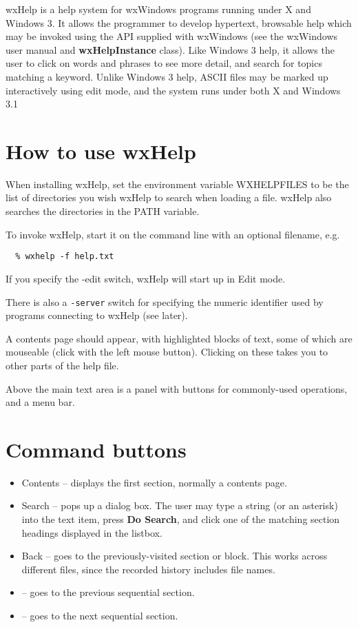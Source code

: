 wxHelp is a help system for wxWindows programs running under X and Windows 3.
It allows the programmer to develop hypertext, browsable help which may be
invoked using the API supplied with wxWindows (see the wxWindows user manual
and {\bf wxHelpInstance} class).  Like Windows 3 help, it allows the user to
click on words and phrases to see more detail, and search for topics matching
a keyword. Unlike Windows 3 help, ASCII files may be marked up interactively
using edit mode, and the system runs under both X and Windows 3.1

\section{How to use wxHelp}

When installing wxHelp, set the environment variable WXHELPFILES to
be the list of directories you wish wxHelp to search when loading a
file. wxHelp also searches the directories in the PATH variable.

To invoke wxHelp, start it on the command line with an optional
filename, e.g.

\begin{verbatim}
  % wxhelp -f help.txt
\end{verbatim}

If you specify the -edit switch, wxHelp will start up in Edit mode.

There is also a {\tt -server} switch for specifying the numeric identifier
used by programs connecting to wxHelp (see later).

A contents page should appear, with highlighted blocks of text, some
of which are mouseable (click with the left mouse button).  Clicking
on these takes you to other parts of the help file.

Above the main text area is a panel with buttons for commonly-used
operations, and a menu bar.

\section{Command buttons}

\begin{itemize}
\item Contents -- displays the first section, normally a contents page.
\item Search -- pops up a dialog box. The user may type a string (or an asterisk)
into the text item, press {\bf Do Search}, and click one of the
matching section headings displayed in the listbox.
\item Back -- goes to the previously-visited section or block. This works across
different files, since the recorded history includes file names.
\item \cinsert -- goes to the previous sequential section.
\item \cextract -- goes to the next sequential section.
\end{itemize}

